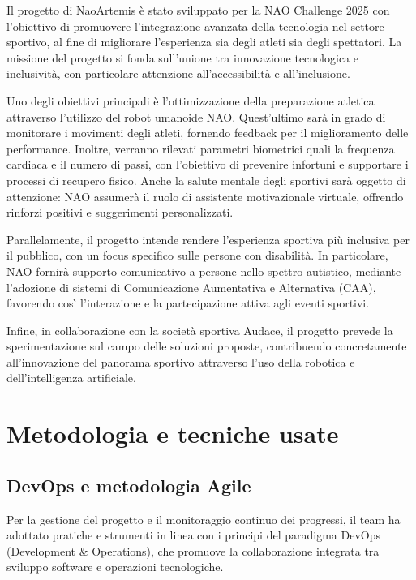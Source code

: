 \documentclass{optica-article}
\begin{document}
\begin{abstract*} 
\vspace{5pt}
\noindent

Il progetto di NaoArtemis è stato sviluppato per la NAO Challenge 2025 con l’obiettivo  di promuovere l’integrazione avanzata della tecnologia nel settore sportivo, al fine di migliorare l’esperienza sia degli atleti sia degli spettatori. La missione del progetto si fonda sull’unione tra innovazione tecnologica e inclusività, con particolare attenzione all’accessibilità e all'inclusione.

Uno degli obiettivi principali è l’ottimizzazione della preparazione atletica attraverso l’utilizzo del robot umanoide NAO. Quest’ultimo sarà in grado di monitorare i movimenti degli atleti, fornendo feedback per il miglioramento delle performance. Inoltre, verranno rilevati parametri biometrici quali la frequenza cardiaca e il numero di passi, con l’obiettivo di prevenire infortuni e supportare i processi di recupero fisico. Anche la salute mentale degli sportivi sarà oggetto di attenzione: NAO assumerà il ruolo di assistente motivazionale virtuale, offrendo rinforzi positivi e suggerimenti personalizzati.

Parallelamente, il progetto intende rendere l’esperienza sportiva più inclusiva per il pubblico, con un focus specifico sulle persone con disabilità. In particolare, NAO fornirà supporto comunicativo a persone nello spettro autistico, mediante l’adozione di sistemi di Comunicazione Aumentativa e Alternativa (CAA), favorendo così l’interazione e la partecipazione attiva agli eventi sportivi.

Infine, in collaborazione con la società sportiva Audace, il progetto prevede la sperimentazione sul campo delle soluzioni proposte, contribuendo concretamente all’innovazione del panorama sportivo attraverso l’uso della robotica e dell’intelligenza artificiale.
\vspace{5pt}
\section{Metodologia e tecniche usate}

\subsection{DevOps e metodologia Agile}
Per la gestione del progetto e il monitoraggio continuo dei progressi, il team ha adottato pratiche e strumenti in linea con i principi del paradigma DevOps (Development \& Operations), che promuove la collaborazione integrata tra sviluppo software e operazioni tecnologiche.


\end{abstract*}
\end{document}
